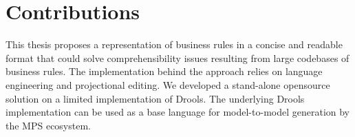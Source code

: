 \section{Contributions}

This thesis proposes a representation of business rules in a concise and readable format that could solve comprehensibility issues resulting from large codebases of business rules.
The implementation behind the approach relies on language engineering and projectional editing.
We developed a stand-alone opensource solution on a limited implementation of Drools.
The underlying Drools implementation can be used as a base language for model-to-model generation by the MPS ecosystem.